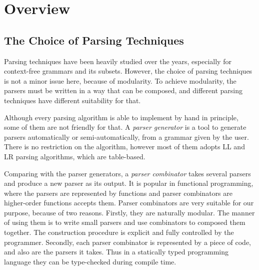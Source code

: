 \section{Overview}\label{sec:overview}

\subsection{The Choice of Parsing Techniques}\label{subsec:overview-parsing}

Parsing techniques have been heavily studied over the years, especially for context-free grammars and its subsets. However, the choice of parsing techniques is not a minor issue here, because of modularity. To achieve modularity, the parsers must be written in a way that can be composed, and different parsing techniques have different suitability for that.

Although every parsing algorithm is able to implement by hand in principle, some of them are not friendly for that. A \textit{parser generator} is a tool to generate parsers automatically or semi-automatically, from a grammar given by the user. There is no restriction on the algorithm, however most of them adopts LL and LR parsing algorithms, which are table-based.


Comparing with the parser generators, a \textit{parser combinator} takes several parsers and produce a new parser as its output. It is popular in functional programming, where the parsers are represented by functions and parser combinators are higher-order functions accepts them. Parser combinators are very suitable for our purpose, because of two reasons. Firstly, they are naturally modular. The manner of using them is to write small parsers and use combinators to composed them together. The construction procedure is explicit and fully controlled by the programmer. Secondly, each parser combinator is represented by a piece of code, and also are the parsers it takes. Thus in a statically typed programming language they can be type-checked during compile time.

